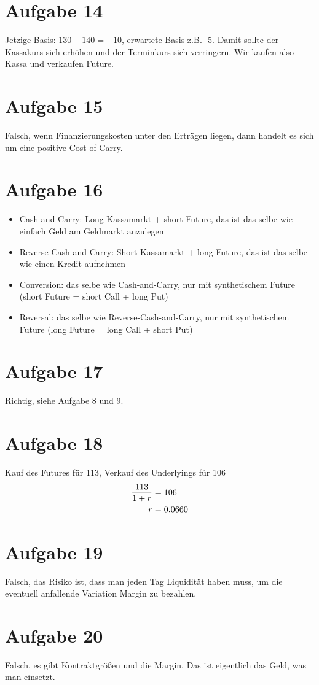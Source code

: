 \documentclass{article}
\begin{document}
	\section*{Aufgabe 14}
	Jetzige Basis: $130-140 = -10$, erwartete Basis z.B. -5. Damit sollte der Kassakurs sich erhöhen und der Terminkurs sich verringern. Wir kaufen also Kassa und verkaufen Future.
	
	\section*{Aufgabe 15}
	Falsch, wenn Finanzierungskosten unter den Erträgen liegen, dann handelt es sich um eine positive Cost-of-Carry.
	
	\section*{Aufgabe 16}
	\begin{itemize}
		\item Cash-and-Carry: Long Kassamarkt + short Future, das ist das selbe wie einfach Geld am Geldmarkt anzulegen
		\item Reverse-Cash-and-Carry: Short Kassamarkt + long Future, das ist das selbe wie einen Kredit aufnehmen
		\item Conversion: das selbe wie Cash-and-Carry, nur mit synthetischem Future (short Future = short Call + long Put)
		\item Reversal: das selbe wie Reverse-Cash-and-Carry, nur mit synthetischem Future (long Future = long Call + short Put)
	\end{itemize}
	
	\section*{Aufgabe 17}
	Richtig, siehe Aufgabe 8 und 9.
	
	\section*{Aufgabe 18}
	Kauf des Futures für 113, Verkauf des Underlyings für 106
	\begin{align}
		\frac{113}{1+r} &= 106 \notag \\
		r &= 0.0660 \notag
	\end{align}
	
	\section*{Aufgabe 19}
	Falsch, das Risiko ist, dass man jeden Tag Liquidität haben muss, um die eventuell anfallende Variation Margin zu bezahlen.
	
	\section*{Aufgabe 20}
	Falsch, es gibt Kontraktgrößen und die Margin. Das ist eigentlich das Geld, was man einsetzt.
	
\end{document}
